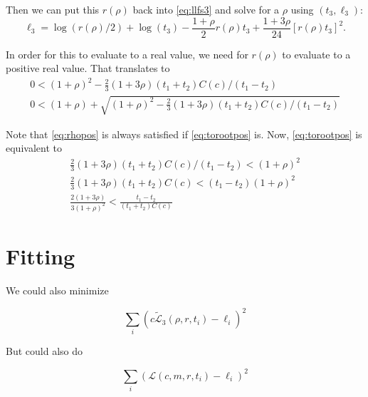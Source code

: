 \documentclass{amsart}
\newcommand{\llf}{\mathcal{L}}   %
\newcommand{\llfs}{\tilde{\llf}}
\newcommand{\loglike}{\ell}           %
\begin{document}
Then we can put this $r(\rho)$ back into \eqref{eq:llfs3} and solve for a $\rho$ using $(t_3, \loglike_3)$:
\begin{equation}
  \loglike_3 = \log(r(\rho)/2) + \log(t_3) - \frac{1+\rho}{2} r(\rho) t_3 + \frac{1+3 \rho}{24} \left[r(\rho) t_3 \right]^2.
\end{equation}

In order for this to evaluate to a real value, we need for $r(\rho)$ to evaluate to a positive real value.
That translates to
\begin{gather}
  0 < (1+\rho)^2 - \frac{2}{3} (1+3 \rho)(t_1 + t_2) C(c) / (t_1 - t_2) \label{eq:torootpos} \\
  0 < (1+\rho) + \sqrt{(1+\rho)^2 - \frac{2}{3} (1+3 \rho)(t_1 + t_2) C(c) / (t_1 - t_2)} \label{eq:rhopos}
\end{gather}

Note that \eqref{eq:rhopos} is always satisfied if \eqref{eq:torootpos} is.
Now, \eqref{eq:torootpos} is equivalent to
\begin{gather}
  \frac{2}{3} (1+3 \rho)(t_1 + t_2) C(c) / (t_1 - t_2) < (1+\rho)^2 \\
  \frac{2}{3} (1+3 \rho)(t_1 + t_2) C(c) < (t_1 - t_2) (1+\rho)^2 \\
  \frac{2 (1+3 \rho)}{3 (1+\rho)^2} < \frac{t_1 - t_2}{(t_1 + t_2) C(c)}
\end{gather}



\section{Fitting}

We could also minimize

\[
  \sum_i \left( c \llfs_3(\rho,r,t_i) - \loglike_i \right)^2
\]

But could also do

\[
  \sum_i \left(\llf(c,m,r,t_i) - \loglike_i \right)^2
\]

\end{document}
